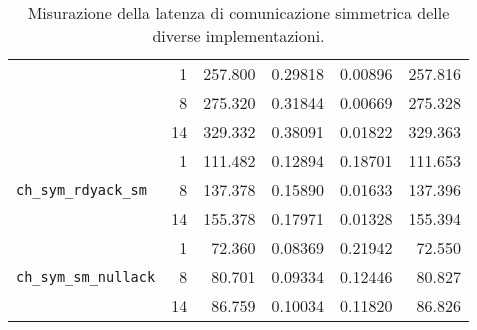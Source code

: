 \begin{table}[!b]
\begin{subtable}[b]{\textwidth}
\begin{tabular}{|l|r|r|r|r|r|}
      & 1 & 257.800 & 0.29818 & 0.00896 & 257.816 \\
      & 8 & 275.320 & 0.31844 & 0.00669 & 275.328 \\
      & 14 & 329.332 & 0.38091 & 0.01822 & 329.363 \\
      \hline
      \multirow{3}{*}{\texttt{ch\_sym\_rdyack\_sm}}
      & 1 & 111.482 & 0.12894 & 0.18701 & 111.653 \\
      & 8 & 137.378 & 0.15890 & 0.01633 & 137.396 \\
      & 14 & 155.378 & 0.17971 & 0.01328 & 155.394 \\
      \hline
      \multirow{3}{*}{\texttt{ch\_sym\_sm\_nullack}}
      & 1 & 72.360 & 0.08369 & 0.21942 & 72.550 \\ 
      & 8 & 80.701 & 0.09334 & 0.12446 & 80.827 \\ 
      & 14 & 86.759 & 0.10034 & 0.11820 & 86.826 \\
      \hline
    \end{tabular}
    \caption[Latenza dei canali di comunicazione simmetrici]{Misurazione della latenza di comunicazione simmetrica delle diverse implementazioni.}
  \end{subtable}

  \vspace{4ex}


\end{table}
